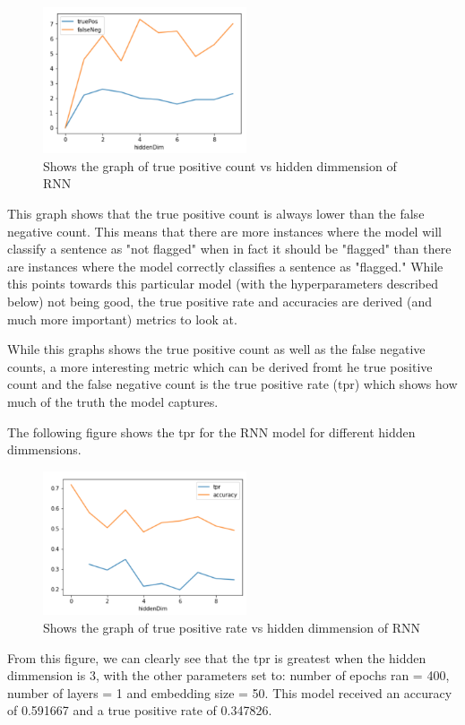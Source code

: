 \documentclass[twoside,twocolumn]{article}
\begin{document}
\begin{figure}[H]
\includegraphics[width=6cm]{hidden_dimm_test_graph}
\centering
\caption{Shows the graph of true positive count vs hidden dimmension of RNN}
\end{figure}

This graph shows that the true positive count is always lower than the false negative count.
This means that there are more instances where the model will classify a sentence as "not flagged"
when in fact it should be "flagged" than there are instances where the model correctly classifies
a sentence as "flagged." While this points towards this particular model
(with the hyperparameters described below) not being good, the true positive rate and accuracies are
derived (and much more important) metrics to look at.

While this graphs shows the true positive count as well as the false negative counts,
a more interesting metric which can be derived fromt he true positive count and
the false negative count is the true positive rate (tpr) which shows how much 
of the truth the model captures.

The following figure shows the tpr for the RNN model for different hidden dimmensions.

\begin{figure}[H]
\includegraphics[width=6cm]{hidden_dimm_test_tpr-graph}
\centering
\caption{Shows the graph of true positive rate vs hidden dimmension of RNN}
\end{figure}

From this figure, we can clearly see that the tpr is greatest when the hidden dimmension is 3,
 with the other parameters set to: number of epochs ran = 400, number of layers = 1 and embedding 
 size = 50. This model received an accuracy of 0.591667 and a true positive rate of 0.347826.
\end{document}
